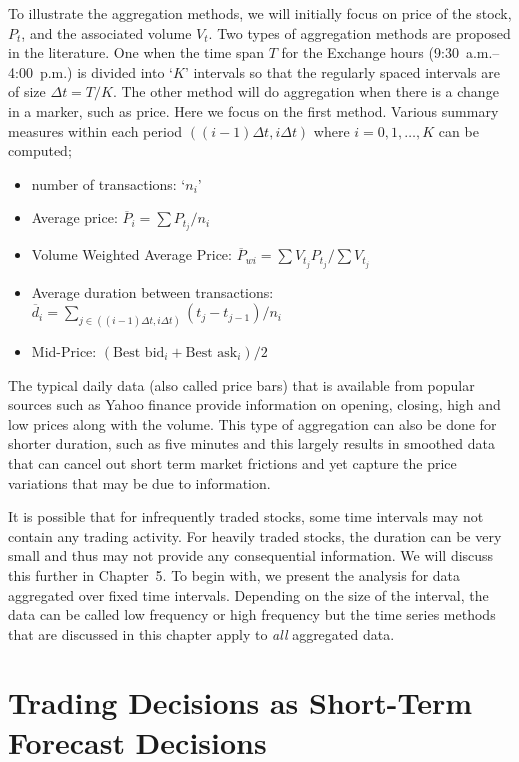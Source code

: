 To illustrate the aggregation methods, we will initially focus on price of the stock, $P_t$, and the associated volume $V_{t}$. Two types of aggregation methods are proposed in the literature. One when the time span $T$ for the Exchange hours (9:30~a.m.--4:00~p.m.) is divided into `$K$' intervals so that the regularly spaced intervals are of size $\Delta t = T/K$. The other method will do aggregation when there is a change in a marker, such as price. Here we focus on the first method. Various summary measures within each period $((i - 1)\Delta t, i\Delta t)$ where $i = 0,1,\ldots,K$ can be computed;
\begin{itemize}
\item number of transactions: `$n_i$'
\item Average price: $\overline{P}_i = \sum P_{t_j}/n_i$
\item Volume Weighted Average Price: $\overline{P}_{wi} = \sum V_{t_j} P_{t_j}/ \sum V_{t_j}$
\item Average duration between transactions: $\overline{d}_i = \sum_{j\in ((i-1)\Delta t,i\Delta t) }(t_j - t_{j-1})/n_i$
\item Mid-Price: $(\text{Best bid}_i+\text{Best ask}_i)/ 2$
\end{itemize}


The typical daily data (also called price bars) that is available from popular sources such as Yahoo finance provide information on opening, closing, high and low prices along with the volume. This type of aggregation can also be done for shorter duration, such as five minutes and this largely results in smoothed data that can cancel out short term market frictions and yet capture the price variations that may be due to information. 


It is possible that for infrequently traded stocks, some time intervals may not contain any trading activity. For heavily traded stocks, the duration can be very small and thus may not provide any consequential information. We will discuss this further in Chapter~5. To begin with, we present the analysis for data aggregated over fixed time intervals. Depending on the size of the interval, the data can be called low frequency or high frequency but the time series methods that are discussed in this chapter apply to \textit{all} aggregated data.



\section{Trading Decisions as Short-Term Forecast Decisions} 


